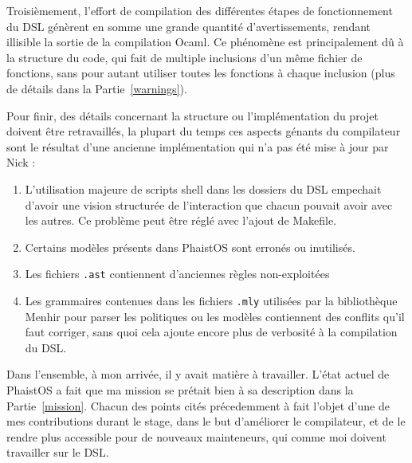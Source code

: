 Troisièmement, l'effort de compilation des différentes étapes de fonctionnement 
du DSL génèrent en somme une grande quantité d'avertissements, rendant 
illisible la sortie de la compilation Ocaml. Ce phénomène est principalement dû 
à la structure du code, qui fait de multiple inclusions d'un même fichier de 
fonctions, sans pour autant utiliser toutes les fonctions à chaque inclusion 
(plus de détails dans la Partie~\ref{warnings}). 

Pour finir, des détails concernant la structure ou l'implémentation du projet 
doivent être retravaillés, la plupart du temps ces aspects génants du 
compilateur sont le résultat d'une ancienne implémentation qui n'a pas été mise 
à jour par Nick :
\begin{enumerate}
    \item L'utilisation majeure de scripts shell dans les dossiers du DSL 
    empechait d'avoir une vision structurée de l'interaction que chacun pouvait 
    avoir avec les autres. Ce problème peut être réglé avec l'ajout de Makefile.
    \item Certains modèles présents dans PhaistOS sont erronés ou inutilisés.
    \item Les fichiers \texttt{.ast} contiennent d'anciennes règles 
    non-exploitées
    \item Les grammaires contenues dans les fichiers \texttt{.mly} utilisées 
    par la bibliothèque Menhir pour parser les politiques ou les modèles 
    contiennent des conflits qu'il faut corriger, sans quoi cela ajoute encore 
    plus de verbosité à la compilation du DSL.
\end{enumerate}

Dans l'ensemble, à mon arrivée, il y avait matière à travailler. L'état actuel 
de PhaistOS a fait que ma mission se prétait bien à sa description dans la 
Partie~\ref{mission}. Chacun des points cités précedemment à fait l'objet d'une 
de mes contributions durant le stage, dans le but d'améliorer le compilateur, 
et de le rendre plus accessible pour de nouveaux mainteneurs, qui comme moi 
doivent travailler sur le DSL.